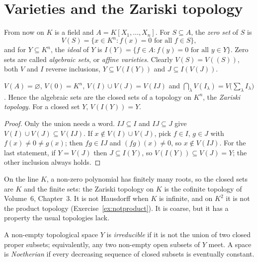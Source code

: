 \section{Varieties and the Zariski topology}

From now on $K$ is a field and $A=K[X_1,\dots,X_n]$. For $S\subseteq A$, the \emph{zero set} of $S$ is
\[V(S)=\{x\in K^n:f(x)=0\text{ for all }f\in S\},\]
and for $Y\subseteq K^n$, the \emph{ideal} of $Y$ is $I(Y)=\{f\in A:f(y)=0\text{ for all }y\in Y\}$. Zero sets are called \emph{algebraic sets}, or \emph{affine varieties}. Clearly $V(S)=V((S))$, both $V$ and $I$ reverse inclusions,
$Y\subseteq V(I(Y))$ and $J\subseteq I(V(J))$.

\begin{proposition}\label{prop:zariski}
$V(A)=\varnothing$, $V(0)=K^n$, $V(I)\cup V(J)=V(IJ)$ and $\bigcap_\lambda V(I_\lambda)=V\bigl(\sum_\lambda I_\lambda\bigr)$. Hence the algebraic sets are the closed sets of a topology on $K^n$, the \emph{Zariski topology}. For a closed set $Y$,
$V(I(Y))=Y$.
\end{proposition}

\begin{proof}
Only the union needs a word. $IJ\subseteq I$ and $IJ\subseteq J$ give $V(I)\cup V(J)\subseteq V(IJ)$. If $x\notin V(I)\cup V(J)$, pick $f\in I$, $g\in J$ with $f(x)\ne0\ne g(x)$; then $fg\in IJ$ and $(fg)(x)\ne0$, so $x\notin V(IJ)$. For the
last statement, if $Y=V(J)$ then $J\subseteq I(Y)$, so $V(I(Y))\subseteq V(J)=Y$; the other inclusion always holds.
\end{proof}

On the line $K$, a non-zero polynomial has finitely many roots, so the closed sets are $K$ and the finite sets: the Zariski topology on $K$ is the cofinite topology of Volume~6, Chapter~3. It is not
Hausdorff when $K$ is infinite, and on $K^2$ it is not the product topology (Exercise~\ref{ex:notproduct}). It is coarse, but it has a property the usual topologies lack.

\begin{definition}\label{def:irreducible}
A non-empty topological space $Y$ is \emph{irreducible} if it is not the union of two closed proper subsets; equivalently, any two non-empty open subsets of $Y$ meet. A space is \emph{Noetherian} if every decreasing
sequence of closed subsets is eventually constant.
\end{definition}

